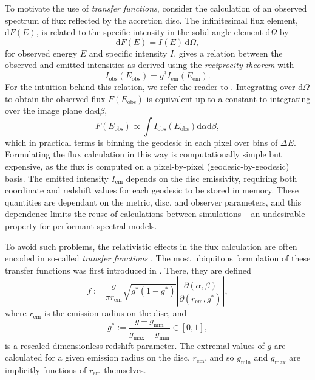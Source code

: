 \documentclass[fleqn,usenatbib]{mnras}
\renewcommand{\d}{\text{d}}
\newcommand{\rhoem}{r_\text{em}}
\newcommand{\jacobian}[2]{\left\lvert \frac{\partial #1}{\partial #2} \right\rvert}
\begin{document}
To motivate the use of \emph{transfer functions}, consider the calculation of an
observed spectrum of flux reflected by the accretion disc. The infinitesimal
flux element, $\d F(E)$, is related to the specific intensity in the solid angle
element $\d \Omega$ by
\begin{equation}
    \label{eq:infinitesimal-flux}
    \d F(E) = I(E)\, \d \Omega,
\end{equation}
for observed energy $E$ and specific intensity $I$.
\cite{cunningham_effects_1975} gives a relation between the observed
and emitted intensities as derived using the \emph{reciprocity theorem} \citep[
equivalently \emph{Liouville's theorem},][]{lindquist_louville_1966} with
\begin{equation}
\label{eq:liouville-theorem}
    I_\text{obs}\left( E_\text{obs}\right) = g^3 I_\text{em}\left(E_\text{em}\right).
\end{equation}
For the intuition behind this relation, we refer the reader to
\citet{ingram_public_2019}. Integrating over $\d \Omega$ to obtain the observed
flux $F(E_\text{obs})$ is equivalent up to a constant to integrating over the
image plane $\d \alpha \d
\beta$,
\begin{equation}
\label{eq:integrate-impact-params}
F(E_\text{obs}) \propto \int I_\text{obs}(E_\text{obs}) \d \alpha \d \beta,
\end{equation}
which in practical terms is binning the geodesic in each pixel over bins of
$\Delta E$.  Formulating the flux calculation in this way is computationally
simple but expensive, as the flux is computed on a pixel-by-pixel
(geodesic-by-geodesic) basis. The emitted intensity $I_\text{em}$ depends on the
disc emissivity, requiring both coordinate and redshift values for each geodesic
to be stored in memory. These quantities are dependant on the metric,
disc, and observer parameters, and this dependence limits the reuse of
calculations between simulations -- an undesirable property for performant spectral models.

To avoid such problems, the relativistic effects in the flux calculation are
often encoded in so-called \emph{transfer functions}
\citep[e.g.][]{brenneman_constraining_2006}. The most ubiquitous formulation of these
transfer functions was first introduced in \cite{cunningham_effects_1975}.
There, they are defined
\begin{equation}
    \label{eq:cunn-transfer-function}
    f:=\frac{g}{\pi \rhoem} \sqrt{g^\ast(1 - g^\ast)} \jacobian{(\alpha, \beta)}{(\rhoem, g^\ast)},
\end{equation}
where $\rhoem$ is the emission radius on the disc, and
\begin{equation}
    g^\ast := \frac{g - g_\text{min}}{g_\text{max} - g_\text{min}} \in [0, 1],
\end{equation}
is a rescaled dimensionless redshift parameter. The extremal values of $g$ are
calculated for a given emission radius on the disc, $\rhoem$, and so
$g_\text{min}$ and $g_\text{max}$ are implicitly functions of $\rhoem$
themselves.
\end{document}
